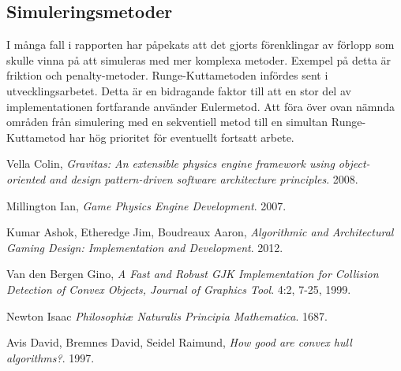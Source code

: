 \documentclass[a4paper,12pt,twopage,swedish]{article}
\begin{document}
\subsection{Simuleringsmetoder}
I många fall i rapporten har påpekats att det gjorts förenklingar av förlopp som skulle vinna på att simuleras med mer komplexa metoder. Exempel på detta är friktion och penalty-metoder.  Runge-Kuttametoden infördes sent i utvecklingsarbetet. Detta är en bidragande faktor till att en stor del av implementationen fortfarande använder Eulermetod. Att föra över ovan nämnda områden från simulering med en sekventiell metod till en simultan Runge-Kuttametod har hög prioritet för eventuellt fortsatt arbete.







\clearpage
\begin{thebibliography}{9}

  Vella Colin,
  \emph{Gravitas: An extensible physics engine framework using object-oriented and design pattern-driven software architecture principles}.
  2008.

  Millington Ian,
  \emph{Game Physics Engine Development}.
  2007.

  Kumar Ashok, Etheredge Jim, Boudreaux Aaron,
  \emph{Algorithmic and Architectural Gaming Design: Implementation and Development}.
  2012.

  Van den Bergen Gino,
  \emph{A Fast and Robust GJK Implementation for Collision Detection of Convex Objects, Journal of Graphics Tool}.
  4:2, 7-25,
  1999.

  Newton Isaac
  \emph{Philosophiæ Naturalis Principia Mathematica}.
  1687.

  Avis David, Bremnes David, Seidel Raimund,
  \emph{How good are convex hull algorithms?}.
  1997.

\end{thebibliography}
\end{document}
